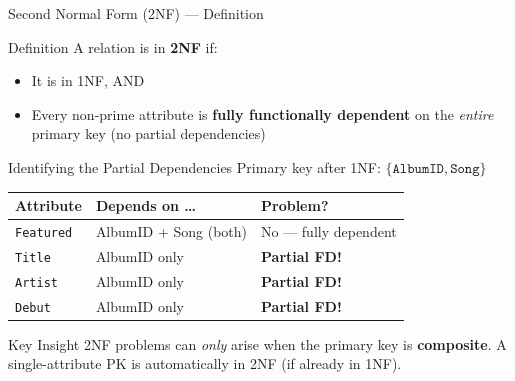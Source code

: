 \begin{frame}{Second Normal Form (2NF) --- Definition}
  \begin{block}{Definition}
    A relation is in \textbf{2NF} if:
    \begin{itemize}
      \item It is in 1NF, AND
      \item Every non-prime attribute is \textbf{fully functionally dependent}
            on the \emph{entire} primary key (no partial dependencies)
    \end{itemize}
  \end{block}

  \begin{block}{Identifying the Partial Dependencies}
    Primary key after 1NF: $\{\texttt{AlbumID}, \texttt{Song}\}$

    \vspace{4pt}
    \small
    \begin{tabular}{lll}
      \toprule
      \textbf{Attribute} & \textbf{Depends on \ldots} & \textbf{Problem?} \\
      \midrule
      \texttt{Featured}  & AlbumID + Song (both)  & No --- fully dependent \\
      \texttt{Title}     & AlbumID only           & \textbf{Partial FD!} \\
      \texttt{Artist}    & AlbumID only           & \textbf{Partial FD!} \\
      \texttt{Debut}     & AlbumID only           & \textbf{Partial FD!} \\
      \bottomrule
    \end{tabular}
  \end{block}

  \begin{alertblock}{Key Insight}
    2NF problems can \emph{only} arise when the primary key is \textbf{composite}.
    A single-attribute PK is automatically in 2NF (if already in 1NF).
  \end{alertblock}
\end{frame}

